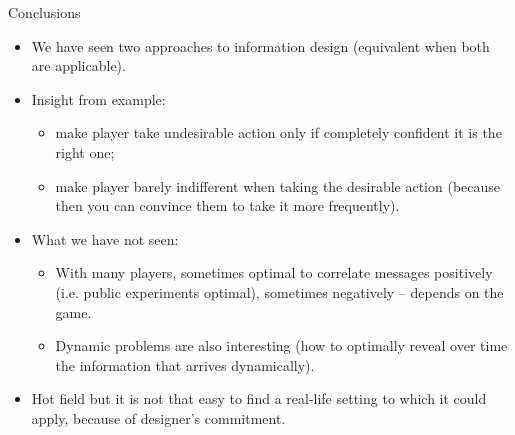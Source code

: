 \documentclass[english,10pt
,aspectratio=169
]{beamer}
\begin{document}
\begin{frame}{Conclusions}
\begin{itemize}
	\item We have seen two approaches to information design (equivalent when both are applicable).
	\item Insight from example: 
	\begin{itemize}
		\item make player take undesirable action only if completely confident it is the right one;
		\item make player barely indifferent when taking the desirable action (because then you can convince them to take it more frequently).
	\end{itemize}
	\item What we have not seen:
	\begin{itemize}
		\item With many players, sometimes optimal to correlate messages positively (i.e. public experiments optimal), sometimes negatively -- depends on the game.
		\item Dynamic problems are also interesting (how to optimally reveal over time the information that arrives dynamically).
	\end{itemize}
	\item Hot field but it is not that easy to find a real-life setting to which it could apply, because of designer's \alert{commitment}.
\end{itemize}
\end{frame}
\end{document}
